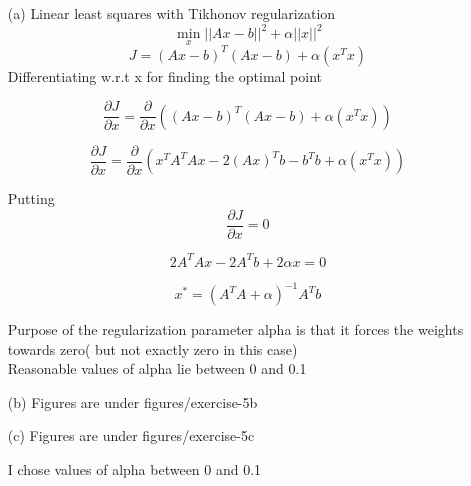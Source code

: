 \documentclass[unicode,11pt,a4paper,oneside,numbers=endperiod,openany]{scrartcl}
\begin{document}
\begin{itemize}
	\item [(a)] {Linear least squares with Tikhonov regularization}
	\begin{equation}
	    \min_x ||{Ax - b}||^2 + \alpha||{x}||^2
	\end{equation}
	\begin{equation}
	    J =  (Ax - b)^T(Ax - b) + \alpha(x^Tx)
	\end{equation}
	{Differentiating w.r.t x for finding the optimal point}
	
	\begin{equation}
	    \frac{\partial J}{\partial x} =  \frac{\partial}{\partial x}{ ((Ax - b)^T(Ax - b) + \alpha(x^Tx))}
	 
	\end{equation}
	
	\begin{equation}
	    \frac{\partial J}{\partial x} =  \frac{\partial}{\partial x}{ (x^TA^TAx - 2 (Ax)^Tb - b^Tb + \alpha(x^Tx))}
	 
	\end{equation}
	
	{Putting}
	\begin{equation}
	    \frac{\partial J}{\partial x} = 0
	\end{equation}
	
	\begin{equation}
	    2A^TAx - 2A^Tb + 2\alpha x = 0
	\end{equation}
	
	\begin{equation}
	    x^* = (A^TA + \alpha)^{-1}A^Tb
	\end{equation}
	
	{Purpose of the regularization parameter alpha is that it forces the weights towards zero( but not exactly zero in this case)}
	\\ 
	{Reasonable values of alpha lie between 0 and 0.1}
	
	\item [(b)] Figures are under figures/exercise-5b
	\item [(c)] Figures are under figures/exercise-5c
	
	{I chose values of alpha between 0 and 0.1}
\end{itemize}


\end{document}
